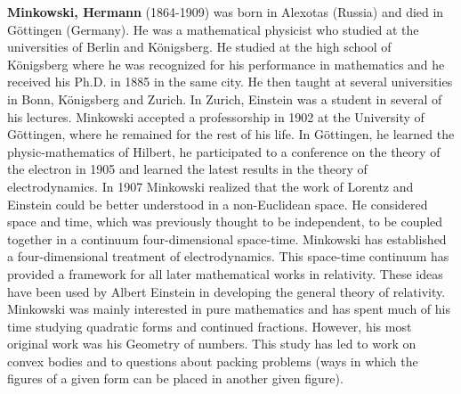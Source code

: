 \textbf{Minkowski, Hermann} (1864-1909) was born in Alexotas (Russia) and died in Göttingen (Germany). He was a mathematical physicist who studied at the universities of Berlin and Königsberg. He studied at the high school of Königsberg where he was recognized for his performance in mathematics and he received his Ph.D. in 1885 in the same city. He then taught at several universities in Bonn, Königsberg and Zurich. In Zurich, Einstein was a student in several of his lectures. Minkowski accepted a professorship in 1902 at the University of Göttingen, where he remained for the rest of his life. In Göttingen, he learned the physic-mathematics of Hilbert, he participated to a conference on the theory of the electron in 1905 and learned the latest results in the theory of electrodynamics. In 1907 Minkowski realized that the work of Lorentz and Einstein could be better understood in a non-Euclidean space. He considered space and time, which was previously thought to be independent, to be coupled together in a continuum four-dimensional space-time. Minkowski has established a four-dimensional treatment of electrodynamics. This space-time continuum has provided a framework for all later mathematical works in relativity. These ideas have been used by Albert Einstein in developing the general theory of relativity. Minkowski was mainly interested in pure mathematics and has spent much of his time studying quadratic forms and continued fractions. However, his most original work was his Geometry of numbers. This study has led to work on convex bodies and to questions about packing problems (ways in which the figures of a given form can be placed in another given figure).

